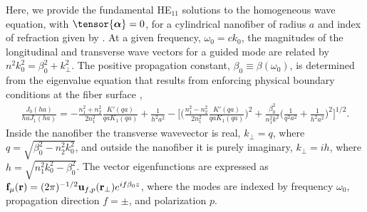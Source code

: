 \documentclass[preprint,aps,pra,onecolumn]{revtex4-1} %
\begin{document}
\begin{appendix}
Here, we provide the fundamental HE$_{11}$ solutions to the homogeneous wave equation,  with $\tensor{\boldsymbol{\alpha}} = 0$, for a cylindrical nanofiber of radius $a$ and index of refraction given by .  At a given frequency, $\omega_0 = c k_0$, the magnitudes of the longitudinal and transverse wave vectors for a guided mode are related by $n^2 k_0^2 = \beta_0^2 + k_\perp^2$.  The positive propagation constant, $\beta_0 \equiv \beta(\omega_0)$, is determined from the eigenvalue equation that results from enforcing physical boundary conditions at the fiber surface \cite{Yariv, Marcuse, Snyder and Love},
	\begin{align}
		\frac{J_0(ha)}{ha J_1(ha)} = - \frac{n_1^2+n_2^2}{2n_1^2} \frac{K'(qa)}{qa K_1(qa)} + \frac{1}{h^2 a^2} - \bigg[ \bigg(\frac{n_1^2 - n_2^2}{2 n_1^2} \frac{K'(qa)}{qa K_1(qa)} \bigg)^2  + \frac{\beta_0^2}{n^2_1 k^2} \bigg(\frac{1}{q^2a^2} + \frac{1}{h^2a^2} \bigg)^2 \bigg]^{1/2}.
	\end{align}
Inside the nanofiber the transverse wavevector is real, $k_\perp = q$, where $q=\sqrt{\beta_0^2- n_2^2k_0^2}$, and outside the nanofiber it is purely imaginary, $k_\perp = i h$, where $h=\sqrt{n_1^2 k_0^2 - \beta_0^2}$.  The vector eigenfunctions are expressed as $\mathbf{f}_{\mu}(\mathbf{r}) = (2\pi)^{-1/2}\mathbf{u}_{f,p}(\mathbf{r}_\perp) e^{i f \beta_0 z}$, where the modes are indexed by frequency $\omega_0$, propagation direction $f = \pm$, and polarization $p$.


\end{appendix}
\end{document}
